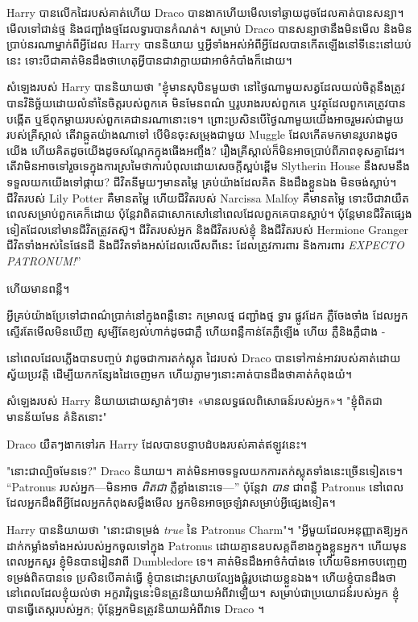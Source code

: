 {{{{{{{{Harry បានលើកដៃរបស់គាត់ហើយ Draco បានងាកហើយមើលទៅឆ្ងាយដូចដែលគាត់បានសន្យា។ មើលទៅជាន់ថ្ម និងជញ្ជាំងថ្មដែលទ្វារបានកំណត់។ សម្រាប់ Draco បានសន្យាថានឹងមិនមើល និងមិនប្រាប់នរណាម្នាក់ពីអ្វីដែល Harry បាននិយាយ ឬអ្វីទាំងអស់អំពីអ្វីដែលបានកើតឡើងនៅទីនេះនៅយប់នេះ ទោះបីជាគាត់មិនដឹងថាហេតុអ្វីបានជាវាក្លាយជាអាថ៌កំបាំងក៏ដោយ។

សំឡេងរបស់ Harry បាននិយាយថា "ខ្ញុំមានសុបិនមួយថា នៅថ្ងៃណាមួយសត្វដែលយល់ចិត្តនឹងត្រូវបានវិនិច្ឆ័យដោយលំនាំនៃចិត្តរបស់ពួកគេ មិនមែនពណ៌ ឬរូបរាងរបស់ពួកគេ ឬវត្ថុដែលពួកគេត្រូវបានបង្កើត ឬឪពុកម្តាយរបស់ពួកគេជានរណានោះទេ។ ព្រោះប្រសិនបើថ្ងៃណាមួយយើងអាចរួមរស់ជាមួយរបស់គ្រីស្តាល់ តើវាឆ្កួតយ៉ាងណាទៅ បើមិនចុះសម្រុងជាមួយ Muggle ដែលកើតមកមានរូបរាងដូចយើង ហើយគិតដូចយើងដូចសណ្តែកក្នុងផើងអញ្ចឹង? រឿង​គ្រីស្តាល់​ក៏​មិន​អាច​ប្រាប់​ពី​ភាព​ខុស​គ្នា​ដែរ។ តើវាមិនអាចទៅរួចទេក្នុងការស្រមៃថាការបំពុលដោយសេចក្តីស្អប់ខ្ពើម Slytherin House នឹងសមនឹងទទួលយកយើងទៅផ្កាយ? ជីវិតនីមួយៗមានតម្លៃ គ្រប់យ៉ាងដែលគិត និងដឹងខ្លួនឯង មិនចង់ស្លាប់។ ជីវិតរបស់ Lily Potter គឺមានតម្លៃ ហើយជីវិតរបស់ Narcissa Malfoy គឺមានតម្លៃ ទោះបីជាវាយឺតពេលសម្រាប់ពួកគេក៏ដោយ ប៉ុន្តែវាពិតជាសោកសៅនៅពេលដែលពួកគេបានស្លាប់។ ប៉ុន្តែ​មាន​ជីវិត​ផ្សេង​ទៀត​ដែល​នៅ​មាន​ជីវិត​ត្រូវ​តស៊ូ។ ជីវិតរបស់អ្នក និងជីវិតរបស់ខ្ញុំ និងជីវិតរបស់ Hermione Granger ជីវិតទាំងអស់នៃផែនដី និងជីវិតទាំងអស់ដែលលើសពីនេះ ដែលត្រូវការពារ និងការពារ \emph{EXPECTO PATRONUM!}”

ហើយមានពន្លឺ។

អ្វីគ្រប់យ៉ាងប្រែទៅជាពណ៌ប្រាក់នៅក្នុងពន្លឺនោះ កម្រាលថ្ម ជញ្ជាំងថ្ម ទ្វារ ផ្លូវដែក ភ្លឺចែងចាំង ដែលអ្នកស្ទើរតែមើលមិនឃើញ សូម្បីតែខ្យល់ហាក់ដូចជាភ្លឺ ហើយពន្លឺកាន់តែភ្លឺឡើង ហើយ ភ្លឺនិងភ្លឺជាង -

នៅពេលដែលភ្លើងបានបញ្ចប់ វាដូចជាការតក់ស្លុត ដៃរបស់ Draco បានទៅកាន់អាវរបស់គាត់ដោយស្វ័យប្រវត្តិ ដើម្បីយកកន្សែងដៃចេញមក ហើយភ្លាមៗនោះគាត់បានដឹងថាគាត់កំពុងយំ។

សំឡេង​របស់ Harry និយាយ​ដោយ​ស្ងាត់ៗ​ថា៖ «មាន​លទ្ធផល​ពិសោធន៍​របស់​អ្នក»។ "ខ្ញុំពិតជាមានន័យមែន គំនិតនោះ"

Draco យឺតៗងាកទៅរក Harry ដែលបានបន្ទាបដំបងរបស់គាត់ឥឡូវនេះ។

"នោះជាល្បិចមែនទេ?" Draco និយាយ។ គាត់​មិន​អាច​ទទួល​យក​ការ​តក់ស្លុត​ទាំងនេះ​ច្រើន​ទៀត​ទេ។ “Patronus របស់អ្នក—មិនអាច \emph{ពិតជា} ភ្លឺខ្លាំងនោះទេ—” ប៉ុន្តែវា \emph{បាន} ជាពន្លឺ Patronus នៅពេលដែលអ្នកដឹងពីអ្វីដែលអ្នកកំពុងសម្លឹងមើល អ្នកមិនអាចច្រឡំវាសម្រាប់អ្វីផ្សេងទៀត។

Harry បាននិយាយថា "នោះជាទម្រង់ \emph{true} នៃ Patronus Charm"។ "អ្វីមួយដែលអនុញ្ញាតឱ្យអ្នកដាក់កម្លាំងទាំងអស់របស់អ្នកចូលទៅក្នុង Patronus ដោយគ្មានឧបសគ្គពីខាងក្នុងខ្លួនអ្នក។ ហើយមុនពេលអ្នកសួរ ខ្ញុំមិនបានរៀនវាពី Dumbledore ទេ។ គាត់មិនដឹងអាថ៌កំបាំងទេ ហើយមិនអាចបញ្ចេញទម្រង់ពិតបានទេ ប្រសិនបើគាត់ធ្វើ ខ្ញុំបានដោះស្រាយល្បែងផ្គុំរូបដោយខ្លួនឯង។ ហើយ​ខ្ញុំ​បាន​ដឹង​ថា នៅ​ពេល​ដែល​ខ្ញុំ​យល់​ថា អក្ខរាវិរុទ្ធ​នេះ​មិន​ត្រូវ​និយាយ​អំពី​វា​ឡើយ។ សម្រាប់ជាប្រយោជន៍របស់អ្នក ខ្ញុំបានធ្វើតេស្តរបស់អ្នក; ប៉ុន្តែអ្នកមិនត្រូវនិយាយអំពីវាទេ Draco ។

}}}}}}}}
